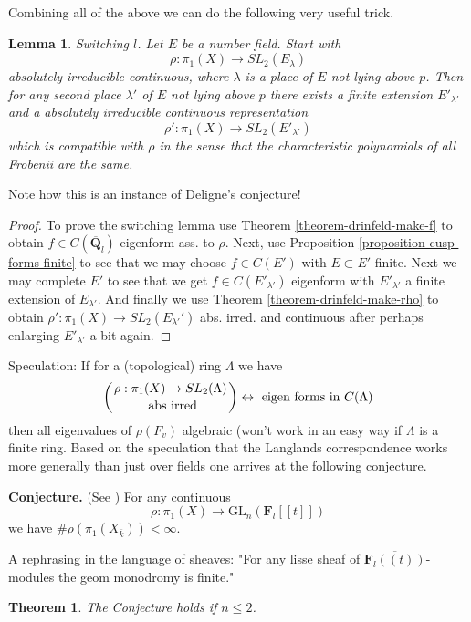 \documentclass{stacks-project}
\theoremstyle{plain}
\newtheorem{theorem}[subsection]{Theorem}
\newtheorem{lemma}[subsection]{Lemma}
\theoremstyle{definition}
\theoremstyle{remark}
\numberwithin{equation}{subsection}
\begin{document}
\noindent
Combining all of the above we can do the following very useful trick.

\begin{lemma}
\label{lemma-switch-l}
Switching $l$. Let $E$ be a number field.
Start with
$$
\rho : \pi_1(X)\to SL_2(E_\lambda)
$$
absolutely irreducible continuous, where $\lambda$ is a place of $E$
not lying above $p$. Then for any second place $\lambda'$ of $E$
not lying above $p$ there exists a finite extension $E'_{\lambda'}$
and a absolutely irreducible continuous representation
$$
\rho': \pi_1(X)\to SL_2(E'_{\lambda'})
$$
which is compatible with $\rho$ in the sense that the characteristic
polynomials of all Frobenii are the same.
\end{lemma}

\noindent
Note how this is an instance of Deligne's conjecture!

\begin{proof}
To prove the switching lemma use
Theorem \ref{theorem-drinfeld-make-f}
to obtain $f\in C(\overline{\mathbf{Q}}_l)$ eigenform ass. to $\rho$.
Next, use
Proposition \ref{proposition-cusp-forms-finite}
to see that we may choose $f\in C(E')$ with $E \subset E'$ finite.
Next we may complete $E'$ to see that we get
$f\in C(E'_{\lambda'})$ eigenform with
$E'_{\lambda'}$ a finite extension of $E_{\lambda'}$.
And finally we use
Theorem \ref{theorem-drinfeld-make-rho}
to obtain
$\rho': \pi_1(X) \to SL_2(E_{\lambda'}')$ abs. irred. and continuous
after perhaps enlarging $E'_{\lambda'}$ a bit again.
\end{proof}

\noindent
Speculation: If for a (topological) ring $\Lambda$ we have
$$
\left(
{\rho : \pi_1(X)\to SL_2(\Lambda) \atop \text{ abs irred}}
\right)
\leftrightarrow
\text{ eigen forms in } C(\Lambda)
$$
then all eigenvalues of $\rho(F_v)$ algebraic (won't work in an easy
way if $\Lambda$ is a finite ring. Based on the speculation that the
Langlands correspondence works more generally than just over fields
one arrives at the following conjecture.

\medskip\noindent
{\bf Conjecture.}
(See \cite{dJ-conjecture})
For any continuous
$$
\rho : \pi_1(X)\to \text{GL}_n(\mathbf{F}_l[[t]])
$$
we have $\# \rho(\pi_1(X_{\overline{k}}))<\infty$.

\medskip\noindent
A rephrasing in the language of sheaves:
"For any lisse sheaf of $\overline{\mathbf{F}_l((t))}$-modules the geom
monodromy is finite."

\begin{theorem}
\label{theorem-conjecture-n-2}
The Conjecture holds if $n\leq 2$.
\end{theorem}
\end{document}
